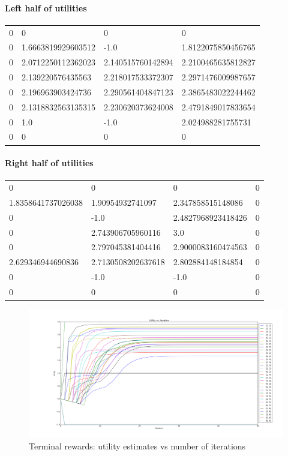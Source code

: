 \paragraph{Left half of utilities}
\begin{tabular}{|l|l|l|l|}
0 & 0 & 0 & 0 \\
0 & 1.6663819929603512 & -1.0 & 1.8122075850456765 \\
0 & 2.0712250112362023 & 2.140515760142894 & 2.2100465635812827 \\
0 & 2.139220576435563 & 2.218017533372307 & 2.2971476009987657 \\
0 & 2.196963903424736 & 2.290561404847123 & 2.3865483022244462 \\
0 & 2.1318832563135315 & 2.230620373624008 & 2.4791849017833654 \\
0 & 1.0 & -1.0 & 2.024988281755731 \\
0 & 0 & 0 & 0 \\
\end{tabular}

\paragraph{Right half of utilities}
\begin{tabular}{|l|l|l|l|}
0 & 0 & 0 & 0 \\
1.8358641737026038 & 1.90954932741097 & 2.347858515148086 & 0 \\
0 & -1.0 & 2.4827968923418426 & 0 \\
0 & 2.743906705960116 & 3.0 & 0 \\
0 & 2.797045381404416 & 2.9000083160474563 & 0 \\
2.629346944690836 & 2.7130508202637618 & 2.802884148184854 & 0 \\
0 & -1.0 & -1.0 & 0 \\
0 & 0 & 0 & 0 \\
\end{tabular}

\begin{figure}[H]
  \centering
  \includegraphics[width=\linewidth]{graphics/term_11_util_iters.png}
  \caption{Terminal rewards: utility estimates vs number of iterations}
\end{figure}

